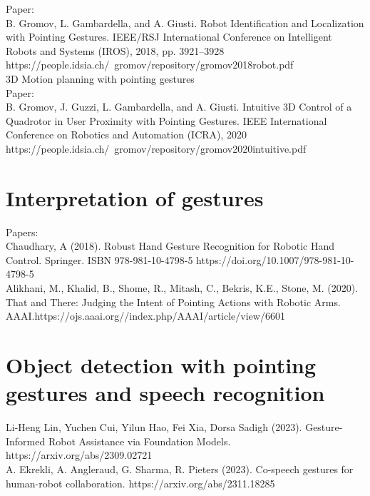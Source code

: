 Paper: \\
B. Gromov, L. Gambardella, and A. Giusti. Robot Identification and Localization with Pointing Gestures. IEEE/RSJ International Conference on Intelligent Robots and Systems (IROS), 2018, pp. 3921–3928 https://people.idsia.ch/~gromov/repository/gromov2018robot.pdf \\

3D Motion planning with pointing gestures \\

Paper: \\
B. Gromov, J. Guzzi, L. Gambardella, and A. Giusti. Intuitive 3D Control of a Quadrotor in User Proximity with Pointing Gestures. IEEE International Conference on Robotics and Automation (ICRA), 2020 https://people.idsia.ch/~gromov/repository/gromov2020intuitive.pdf

\section{Interpretation of gestures}
Papers:\\

Chaudhary, A (2018). Robust Hand Gesture Recognition for Robotic Hand Control. Springer. ISBN 978-981-10-4798-5 https://doi.org/10.1007/978-981-10-4798-5\\

Alikhani, M., Khalid, B., Shome, R., Mitash, C., Bekris, K.E., Stone, M. (2020). That and There: Judging the Intent of Pointing Actions with Robotic Arms. AAAI.https://ojs.aaai.org//index.php/AAAI/article/view/6601\\

\section{Object detection with pointing gestures and speech recognition}
Li-Heng Lin, Yuchen Cui, Yilun Hao, Fei Xia, Dorsa Sadigh (2023). Gesture-Informed Robot Assistance via Foundation Models. https://arxiv.org/abs/2309.02721 \\

A. Ekrekli, A. Angleraud, G. Sharma, R. Pieters (2023). Co-speech gestures for human-robot collaboration. https://arxiv.org/abs/2311.18285 \\



% 

% 

% 
%


